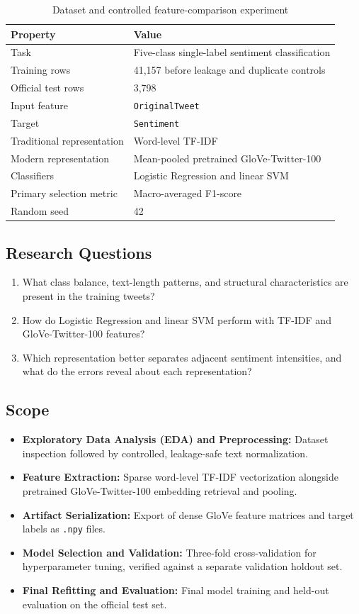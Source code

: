 \begin{table}[H]
\centering
\begin{tabularx}{\textwidth}{|l|X|}
\hline
Property & Value \\
\hline
Task & Five-class single-label sentiment classification \\
\hline
Training rows & 41,157 before leakage and duplicate controls \\
\hline
Official test rows & 3,798 \\
\hline
Input feature & \texttt{OriginalTweet} \\
\hline
Target & \texttt{Sentiment} \\
\hline
Traditional representation & Word-level TF-IDF \\
\hline
Modern representation & Mean-pooled pretrained GloVe-Twitter-100 \\
\hline
Classifiers & Logistic Regression and linear SVM \\
\hline
Primary selection metric & Macro-averaged F1-score \\
\hline
Random seed & 42 \\
\hline
\end{tabularx}
\caption{Dataset and controlled feature-comparison experiment}
\end{table}

\subsection{Research Questions}
\begin{enumerate}
  \item What class balance, text-length patterns, and structural characteristics are present in the training tweets?
  \item How do Logistic Regression and linear SVM perform with TF-IDF and GloVe-Twitter-100 features?
  \item Which representation better separates adjacent sentiment intensities, and what do the errors reveal about each representation?
\end{enumerate}

\subsection{Scope}
\begin{itemize}
  \item \textbf{Exploratory Data Analysis (EDA) and Preprocessing:} Dataset inspection followed by controlled, leakage-safe text normalization.
  \item \textbf{Feature Extraction:} Sparse word-level TF-IDF vectorization alongside pretrained GloVe-Twitter-100 embedding retrieval and pooling.
  \item \textbf{Artifact Serialization:} Export of dense GloVe feature matrices and target labels as \texttt{.npy} files.
  \item \textbf{Model Selection and Validation:} Three-fold cross-validation for hyperparameter tuning, verified against a separate validation holdout set.
  \item \textbf{Final Refitting and Evaluation:} Final model training and held-out evaluation on the official test set.
\end{itemize}